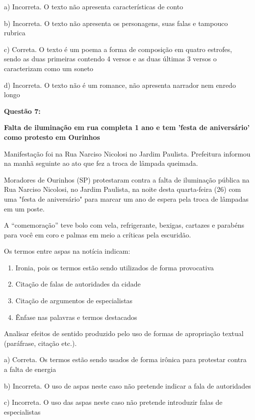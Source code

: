 a) Incorreta. O texto não apresenta características de conto

b) Incorreta. O texto não apresenta os personagens, suas falas e
tampouco rubrica

c) Correta. O texto é um poema a forma de composição em quatro estrofes,
sendo as duas primeiras contendo 4 versos e as duas últimas 3 versos o
caracterizam como um soneto

d) Incorreta. O texto não é um romance, não apresenta narrador nem
enredo longo

\textbf{Questão 7:}

\textbf{Falta de iluminação em rua completa 1 ano e tem 'festa de
aniversário' como protesto em Ourinhos}

Manifestação foi na Rua Narciso Nicolosi no Jardim Paulista. Prefeitura
informou na manhã seguinte ao ato que fez a troca de lâmpada queimada.

Moradores de Ourinhos (SP) protestaram contra a falta de iluminação
pública na Rua Narciso Nicolosi, no Jardim Paulista, na noite desta
quarta-feira (26) com uma "festa de aniversário" para marcar um ano de
espera pela troca de lâmpadas em um poste.

A ``comemoração'' teve bolo com vela, refrigerante, bexigas, cartazes e
parabéns para você em coro e palmas em meio a críticas pela escuridão.

Os termos entre aspas na notícia indicam:

\begin{enumerate}
\def\labelenumi{\alph{enumi})}
\item
  Ironia, pois os termos estão sendo utilizados de forma provocativa
\item
  Citação de falas de autoridades da cidade
\item
  Citação de argumentos de especialistas
\item
  Ênfase nas palavras e termos destacados
\end{enumerate}

Analisar efeitos de sentido produzido pelo uso de formas de apropriação
textual (paráfrase, citação etc.).

a) Correta. Os termos estão sendo usados de forma irônica para protestar
contra a falta de energia

b) Incorreta. O uso de aspas neste caso não pretende indicar a fala de
autoridades

c) Incorreta. O uso das aspas neste caso não pretende introduzir falas
de especialistas

